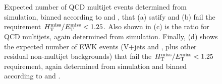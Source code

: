 \begin{figure}[!h]
  \centering
   \\
   \\
  \caption{Expected number of QCD multijet events determined from
    simulation, binned according to \njet and \scalht, that (a) satify
    and (b) fail the requirement $\mbox{$\mbox{$H_{\rm T}^{\rm miss}$} / \mbox{$E_\text{T}^{\rm miss}$}$} < 1.25$. Also shown in (c)
    is the ratio \rmhtmet for QCD multijets, again determined from
    simulation. Finally, (d) shows the expected number of EWK events
    (V+jets and \ttbar, plus other residual non-multijet backgrounds)
    that fail the $\mbox{$\mbox{$H_{\rm T}^{\rm miss}$} / \mbox{$E_\text{T}^{\rm miss}$}$} < 1.25$ requirement, again determined from
    simulation and binned according to \njet and \scalht.}
  \label{fig:qcd_plots}
\end{figure}

